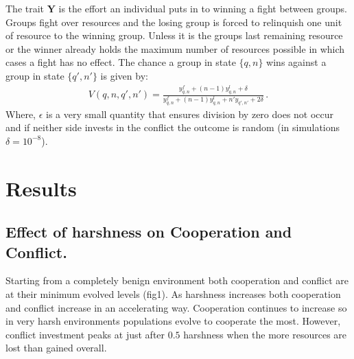 The trait $\mathbf{Y}$ is the effort an individual puts in to winning a fight between groups. Groups fight over resources and the losing group is forced to relinquish one unit of resource to the winning group. Unless it is the groups last remaining resource or the winner already holds the maximum number of resources possible in which cases a fight has no effect. The chance a group in state $\{q,n\}$ wins against a group in state $\{q',n'\}$ is given by:
\begin{align}
    V(q, n, q', n') = \frac{y^f_{q,n} + (n-1)y^l_{q,n} + \delta}{y^f_{q,n} + (n-1)y^l_{q,n} + n'y_{q',n'} + 2\delta}\,.
\end{align}
Where, $\epsilon$ is a very small quantity that ensures division by zero does not occur and if neither side invests in the conflict the outcome is random (in simulations $\delta = 10^{-8}$). 

\section{Results}
\subsection{Effect of harshness on Cooperation and Conflict.}
Starting from a completely benign environment both cooperation and conflict are at their minimum evolved levels (fig1). As harshness increases both cooperation and conflict increase in an accelerating way. Cooperation continues to increase so in very harsh environments populations evolve to cooperate the most. However, conflict investment peaks at just after $0.5$ harshness when the more resources are lost than gained overall.  


